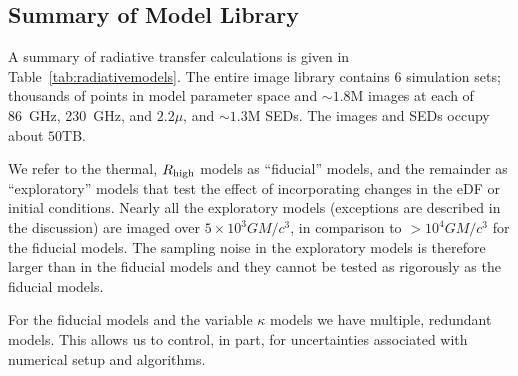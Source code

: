 \subsection{Summary of \sgra Model Library}


A summary of radiative transfer calculations is given in Table~\ref{tab:radiativemodels}. The entire image library contains $6$ simulation sets; thousands of points in model parameter space and $\sim 1.8$M images at each of 86~GHz, 230~GHz, and $2.2\mu$, and $\sim1.3$M SEDs.  The images and SEDs occupy about $50$TB.

We refer to the thermal, $R_\mathrm{high}$ models as ``fiducial'' models, and the remainder as ``exploratory'' models that test the effect of incorporating changes in the eDF or initial conditions.  Nearly all the exploratory models (exceptions are described in the discussion) are imaged over $5 \times 10^3 G M/c^3$, in comparison to $> 10^4 G M/c^3$ for the fiducial models. The sampling noise in the exploratory models is therefore larger than in the fiducial models and they cannot be tested as rigorously as the fiducial models.

For the fiducial models and the variable $\kappa$ models we have multiple, redundant models.  This allows us to control, in part, for uncertainties associated with numerical setup and algorithms.

